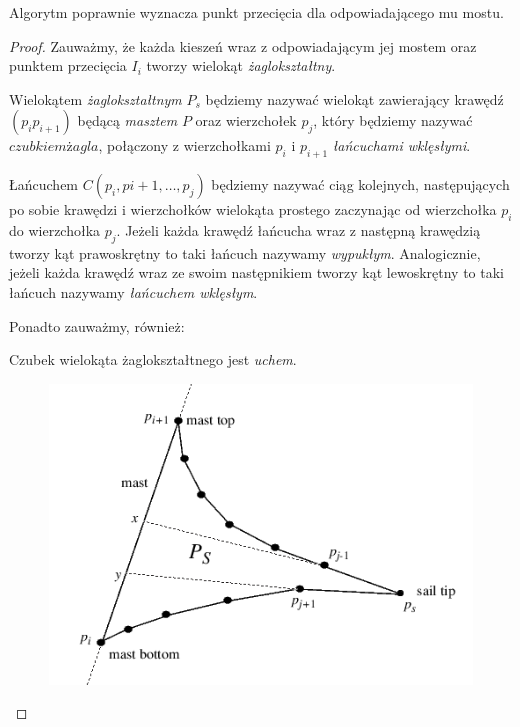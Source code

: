 \begin{lemat}
  Algorytm poprawnie wyznacza punkt przecięcia dla odpowiadającego mu
  mostu.
\end{lemat}

\begin{proof}
  Zauważmy, że każda kieszeń wraz z odpowiadającym jej mostem oraz
  punktem przecięcia $I_i$ tworzy wielokąt \emph{żaglokształtny}.

  \begin{definicja}
    Wielokątem \emph{żaglokształtnym} $P_s$ będziemy nazywać wielokąt
    zawierający krawędź $(p_{i}p_{i+1})$ będącą \emph{masztem} $P$
    oraz wierzchołek $p_j$, który będziemy nazywać $czubkiem żagla$,
    połączony z wierzchołkami $p_i$ i $p_{i+1}$ \emph{łańcuchami
      wklęsłymi}.
  \end{definicja}

  \begin{definicja}
    Łańcuchem $C(p_i,p{i+1},\ldots,p_j)$ będziemy nazywać ciąg
    kolejnych, następujących po sobie krawędzi i wierzchołków
    wielokąta prostego zaczynając od wierzchołka $p_i$ do wierzchołka
    $p_j$. Jeżeli każda krawędź łańcucha wraz z następną krawędzią
    tworzy kąt prawoskrętny to taki łańcuch nazywamy
    \emph{wypukłym}. Analogicznie, jeżeli każda krawędź wraz ze swoim
    następnikiem tworzy kąt lewoskrętny to taki łańcuch nazywamy
    \emph{łańcuchem wklęsłym}.
  \end{definicja}

  Ponadto zauważmy, również:

  \begin{lemat}\label{lem:sailtip}
    Czubek wielokąta żaglokształtnego jest \emph{uchem}.
  \end{lemat}

  \begin{figure}[htb]
    \centering
    \includegraphics[scale=0.7]{img/toussaint3}
    \caption{\label{img:toussaint3}}
  \end{figure}



\end{proof}
